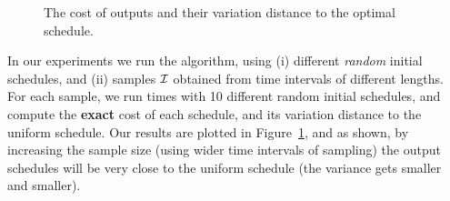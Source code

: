 \begin{figure}[htbp]
	\caption{The cost of \algonameapx outputs and their variation distance to the optimal schedule.} \label{fig:unique}
\end{figure}

In our experiments we run the \algonameapx algorithm, using (i) different \emph{random} initial schedules, and (ii) samples $\mathcal{I}$ obtained from time intervals of different lengths. For each sample, we run  times with 10 different random initial schedules, and compute the \textbf{exact} cost of each schedule, and its variation distance to the uniform schedule. Our results are plotted in Figure~\ref{fig:unique}, and as shown, by increasing the sample size (using wider time intervals of sampling) the output schedules will be very close to the uniform schedule (the variance gets smaller and smaller).
